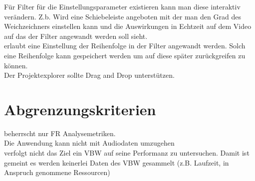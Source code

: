  Für Filter für die Einstellungsparameter existieren kann man diese interaktiv verändern. Z.b. Wird eine Schiebeleiste angeboten mit der man den Grad des Weichzeichners einstellen kann und die Auswirkungen in Echtzeit auf dem Video auf das der Filter angewandt werden soll sieht.\\
 \projektTitel erlaubt eine Einstellung der Reihenfolge in der Filter angewandt werden. Solch
			eine Reihenfolge kann gespeichert werden um auf diese später zurückgreifen zu können.\\
 Der Projektexplorer sollte Drag and Drop unterstützen.
\section{Abgrenzungskriterien}
\setcounter{counterKriterien}{0}
 \projektTitel beherrscht nur \gls{FR} Analysemetriken.\\
 Die Anwendung kann nicht mit Audiodaten umzugehen\\
 \projektTitel verfolgt nicht das Ziel ein \gls{VBW} auf seine Performanz zu untersuchen. Damit ist gemeint es werden keinerlei Daten des \gls{VBW} gesammelt (z.B. Laufzeit, in Anspruch genommene Ressourcen)\\

